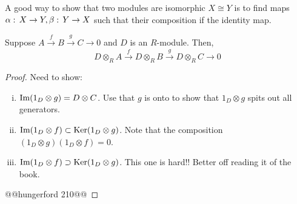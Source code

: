 \begin{remarks}
A good way to show that two modules are isomorphic $X\cong Y$ is to find maps $\alpha:\, X \to Y, \beta:\, Y \to X$ such that their composition if the identity map.
\end{remarks}

\begin{teorema}
Suppose $A\xrightarrow{f} B \xrightarrow{g} C\to 0$ and $D$ is an $R$-module. Then, 
$$D\otimes_R A\xrightarrow{f} D\otimes_R B \xrightarrow{g} D\otimes_R C\to 0$$
\begin{proof}
Need to show: 
\begin{enumerate}[(i)]
\item $\operatorname{Im}(1_D\otimes g) = D\otimes C$. Use that $g$ is onto to show that $1_D\otimes g$ spits out all generators.
\item  $\operatorname{Im}(1_D\otimes f)\subset \operatorname{Ker}(1_D\otimes g)$. Note that the composition $(1_D\otimes g)(1_D\otimes f) =0$.
\item  $\operatorname{Im}(1_D\otimes f)\supset \operatorname{Ker}(1_D\otimes g)$. This one is hard!! Better off reading it of the book.
\end{enumerate}
@@hungerford 210@@
\end{proof}
\end{teorema}
